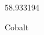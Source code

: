 \documentclass[12pt]{article}
\begin{document}
\hfill{}
\vfill
\begin{center}
  {\fontsize{50}{60}
  }

  \vspace{1em}

  58.933194

Cobalt
\end{center}
\vfill
\end{document}
